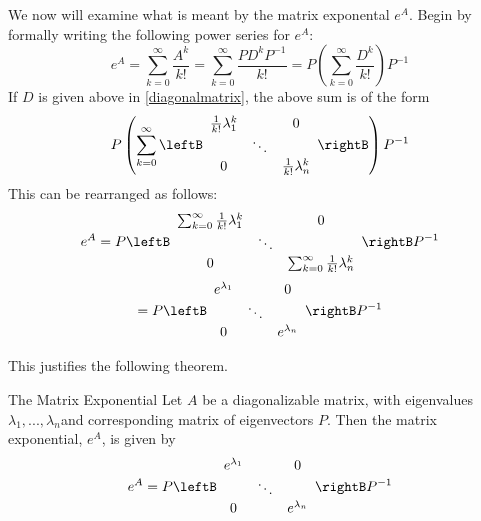 We now will examine what is meant by the matrix exponental $e^{A}$. Begin by formally writing the following power series for $e^{A}$:
\begin{equation*}
e^{A} =  \sum_{k=0}^{\infty }\frac{A^{k}}{k!}=\sum_{k=0}^{\infty }\frac{PD^{k}P^{-1}}{k!}=P \left( \sum_{k=0}^{\infty }\frac{D^{k}}{k!} \right)P^{-1}
\end{equation*}
If $D$ is given above in \ref{diagonalmatrix}, the above sum is of the form 
\begin{equation*}
P \left( \sum_{k=0}^{\infty }\leftB 
\begin{array}{ccc}
\frac{1}{k!}\lambda _{1}^{k} &  & 0 \\ 
& \ddots &  \\ 
0 &  & \frac{1}{k!}\lambda _{n}^{k}
\end{array}
\rightB \right) P^{-1}
\end{equation*}
This can be rearranged as follows:
\begin{equation*}
e^{A}=P\leftB 
\begin{array}{ccc}
\sum_{k=0}^{\infty }\frac{1}{k!}\lambda _{1}^{k} &  & 0 \\ 
& \ddots &  \\ 
0 &  & \sum_{k=0}^{\infty }\frac{1}{k!}\lambda _{n}^{k}
\end{array}
\rightB P^{-1}
\end{equation*}
\begin{equation*}
=P\leftB 
\begin{array}{ccc}
e^{\lambda _{1}} &  & 0 \\ 
& \ddots &  \\ 
0 &  & e^{\lambda _{n}}
\end{array}
\rightB P^{-1}
\end{equation*}

This justifies the following theorem. 

\begin{theorem}{The Matrix Exponential}\label{thm:matrixexponential}
Let $A$ be a diagonalizable matrix, with eigenvalues $\lambda_1, ..., \lambda_n$and corresponding matrix of eigenvectors $P$. Then the matrix exponential, $e^{A}$, is given by
\begin{equation*}
e^{A} = 
P\leftB 
\begin{array}{ccc}
e^{\lambda _{1}} &  & 0 \\ 
& \ddots &  \\ 
0 &  & e^{\lambda _{n}}
\end{array}
\rightB P^{-1}
\end{equation*}
\end{theorem}

